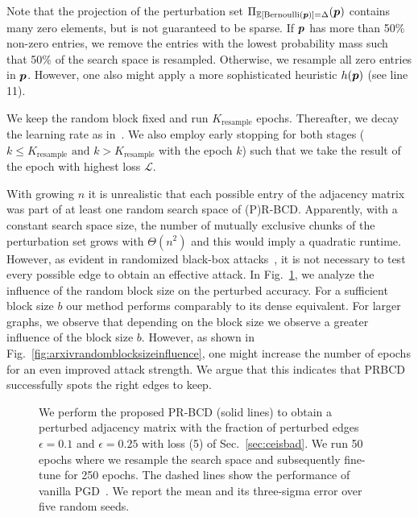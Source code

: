 \documentclass[sigconf,authordraft]{acmart}
\begin{document}
Note that the projection of the perturbation set \(\Pi_{\mathbb{E}[\text{Bernoulli}({\bm{p}})] = \Delta} ({\bm{p}})\) contains many zero elements, but is not guaranteed to be sparse. If \({\bm{p}}\) has more than 50\% non-zero entries, we remove the entries with the lowest probability mass such that 50\% of the search space is resampled. Otherwise, we resample all zero entries in \({\bm{p}}\). However, one also might apply a more sophisticated heuristic \(h({\bm{p}})\) (see line 11).

We keep the random block fixed and run \(K_{\text{resample}}\) epochs. Thereafter, we decay the learning rate as in~\cite{Xu2019a}. We also employ early stopping for both stages (\(k \le K_{\text{resample}} \text{ and } k > K_{\text{resample}}\) with the epoch \(k\)) such that we take the result of the epoch with highest loss \(\mathcal{L}\).

With growing \(n\) it is unrealistic that each possible entry of the adjacency matrix was part of at least one random search space of (P)R-BCD. Apparently, with a constant search space size, the number of mutually exclusive chunks of the perturbation set grows with \(\Theta(n^2)\) and this would imply a quadratic runtime. However, as evident in randomized black-box attacks~\citep{Waniek2018}, it is not necessary to test every possible edge to obtain an effective attack. In Fig.~\ref{fig:randomblocksizeinfluence}, we analyze the influence of the random block size on the perturbed accuracy. For a sufficient block size \(b\) our method performs comparably to its dense equivalent. For larger graphs, we observe that depending on the block size we observe a greater influence of the block size \(b\). However, as shown in Fig.~\ref{fig:arxivrandomblocksizeinfluence}, one might increase the number of epochs for an even improved attack strength. We argue that this indicates that PRBCD successfully spots the right edges to keep.

\begin{figure}[t]
  \centering
  \resizebox{\linewidth}{!}{}
  \caption{We perform the proposed PR-BCD (solid lines) to obtain a perturbed adjacency matrix with the fraction of perturbed edges \(\epsilon=0.1\) and \(\epsilon=0.25\) with loss (5) of Sec.~\ref{sec:ceisbad}. We run 50 epochs where we resample the search space and subsequently fine-tune for 250 epochs. The dashed lines show the performance of vanilla PGD~\citep{Xu2019a}. We report the mean and its three-sigma error over five random seeds. \label{fig:randomblocksizeinfluence}}
\end{figure}
\end{document}
